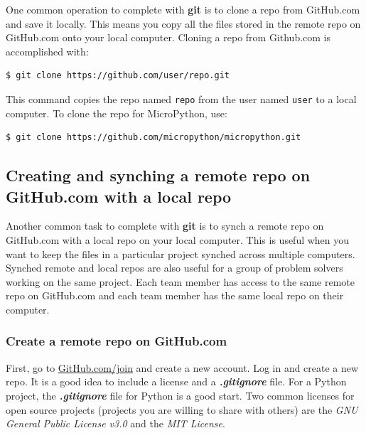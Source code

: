 \documentclass{book}
\begin{document}
    
        One common operation to complete with \textbf{git} is to clone a repo
from GitHub.com and save it locally. This means you copy all the files
stored in the remote repo on GitHub.com onto your local computer.
Cloning a repo from Github.com is accomplished with:

\begin{lstlisting}
$ git clone https://github.com/user/repo.git
\end{lstlisting}

This command copies the repo named \lstinline!repo! from the user named
\lstinline!user! to a local computer. To clone the repo for MicroPython,
use:

\begin{lstlisting}
$ git clone https://github.com/micropython/micropython.git
\end{lstlisting}
    




    
        \subsection{Creating and synching a remote repo on GitHub.com with a
local
repo}\label{creating-and-synching-a-remote-repo-on-github.com-with-a-local-repo}
    




    
        Another common task to complete with \textbf{git} is to synch a remote
repo on GitHub.com with a local repo on your local computer. This is
useful when you want to keep the files in a particular project synched
across multiple computers. Synched remote and local repos are also
useful for a group of problem solvers working on the same project. Each
team member has access to the same remote repo on GitHub.com and each
team member has the same local repo on their computer.

\subsubsection{Create a remote repo on
GitHub.com}\label{create-a-remote-repo-on-github.com}

First, go to \href{https://github.com/join}{GitHub.com/join} and create
a new account. Log in and create a new repo. It is a good idea to
include a license and a \textbf{\emph{.gitignore}} file. For a Python
project, the \textbf{\emph{.gitignore}} file for Python is a good start.
Two common licenses for open source projects (projects you are willing
to share with others) are the \emph{GNU General Public License v3.0} and
the \emph{MIT License}.
\end{document}
